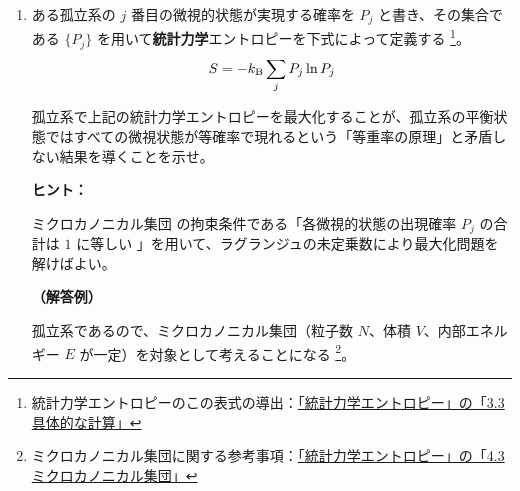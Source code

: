 \documentclass[uplatex,dvipdfmx,a4paper,11pt]{jsarticle}
\begin{document}
\newpage




\vspace{8pt}

\begin{enumerate}
\setlength{\parskip}{0cm} %
\setlength{\itemsep}{0.3cm} %
%


\item
ある孤立系の $j$ 番目の微視的状態が実現する確率を $P_j$ と書き、その集合である $\{ P_j \}$ を用いて{\bf 統計力学}エントロピーを下式によって定義する
\footnote{
統計力学エントロピーのこの表式の導出：\href{http://kisokouza.island.ac/documents/Stat_Phys_Entropy.pdf}{「統計力学エントロピー」の「3.3 具体的な計算」}
}。
\begin{equation*}
  S = -k_{\rm B} \sum_j P_j \ln P_j
  \label{eq: SM_S}
\end{equation*}

孤立系で上記の統計力学エントロピーを最大化することが、孤立系の平衡状態ではすべての微視状態が等確率で現れるという「等重率の原理」と矛盾しない結果を導くことを示せ。

\begin{itembox}[l]{{\bf ヒント：}}

ミクロカノニカル集団%
の拘束条件である「各微視的状態の出現確率 $P_j$ の合計は $1$ に等しい 」を用いて、ラグランジュの未定乗数により最大化問題を解けばよい。

\end{itembox}

{\bf （解答例）}

孤立系であるので、ミクロカノニカル集団（粒子数 $N$、体積 $V$、内部エネルギー $E$ が一定）を対象として考えることになる
\footnote{
ミクロカノニカル集団に関する参考事項：\href{http://kisokouza.island.ac/documents/Stat_Phys_Entropy.pdf}{「統計力学エントロピー」の「4.3 ミクロカノニカル集団」}
}。


\end{enumerate}
\end{document}
